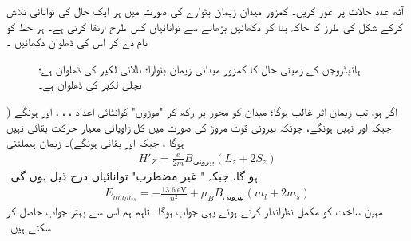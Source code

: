  
 
آٹھ عدد  حالات  پر غور کریں۔ کمزور میدان زیمان بٹوارے   کی صورت میں ہر  ایک حال کی توانائی تلاش کرکے شکل    کی طرز کا خاکہ بنا کر دکھائیں  بڑھانے سے توانائیاں کس طرح ارتقا کرتی ہے۔  ہر خط کو نام دے کر اس کی ڈھلوان دکھائیں ۔
\begin{figure}
\centering
{}
\caption{ہائیڈروجن کے زمینی حال کا کمزور میدانی زیمان بٹوارا؛ بالائی  لکیر   کی ڈھلوان  ہے؛ نچلی لکیر  کی ڈھلوان  ہے۔}
\label{شکل_غیر_تابع_اضطراب_زیمان_بٹوارا_کمزور_میدان}
\end{figure}




اگر  ہو،   تب  زیمان  اثر غالب ہوگا؛  میدان  کو  محور پر رکھ کر  "موزوں" کوانٹائی  اعداد ، ، ، اور  ہونگے  ( جبکہ  اور  نہیں ہونگے،  چونکہ بیرونی قوت مروڑ کی صورت میں کل زاویائی  معیار حرکت بقائی  نہیں ہوگا  ، جبکہ  اور  بقائی  ہونگے)۔  زیمان ہیملٹنی 
\begin{align*}
H'_Z = \frac{e}{2m} B_{\text{بیرونی}} (L_z + 2S_z)
\end{align*}
ہو گا، جبکہ " غیر مضطرب"  توانائیاں  درج ذیل ہوں گی۔ 
\begin{align}\label{مساوات_غیر_مضطرب_طاقتور_زیمان_حصہ}
E_{nm_lm_s} = - \frac{\SI{13.6}{\electronvolt}}{n^2} + \mu_B B_{\text{بیرونی}} (m_l + 2m_s)
\end{align}
مہین ساخت کو مکمل نظرانداز کرتے ہوئے یہی جواب ہوگا۔ تاہم ہم  اس سے بہتر  جواب حاصل کر سکتے ہیں۔

